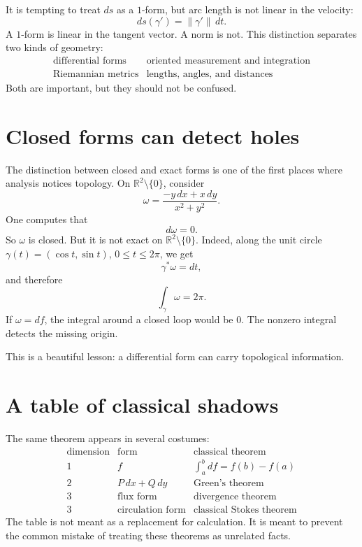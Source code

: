It is tempting to treat \(ds\) as a \(1\)-form, but arc length is not linear in the velocity:
\[
  ds(\gamma')=\|\gamma'\|\,dt.
\]
A \(1\)-form is linear in the tangent vector. A norm is not. This distinction separates two kinds of geometry:
\[
\begin{array}{c|c}
\text{differential forms} & \text{oriented measurement and integration}\\
\text{Riemannian metrics} & \text{lengths, angles, and distances}
\end{array}
\]
Both are important, but they should not be confused.


\section{Closed forms can detect holes}

The distinction between closed and exact forms is one of the first places where analysis notices topology.  On \(\mathbb R^2\setminus\{0\}\), consider
\[
  \omega=\frac{-y\,dx+x\,dy}{x^2+y^2}.
\]
One computes that
\[
  d\omega=0.
\]
So \(\omega\) is closed.  But it is not exact on \(\mathbb R^2\setminus\{0\}\).  Indeed, along the unit circle \(\gamma(t)=(\cos t,\sin t)\), \(0\le t\le2\pi\), we get
\[
  \gamma^*\omega=dt,
\]
and therefore
\[
  \int_\gamma\omega=2\pi.
\]
If \(\omega=df\), the integral around a closed loop would be \(0\).  The nonzero integral detects the missing origin.

This is a beautiful lesson: a differential form can carry topological information.

\section{A table of classical shadows}

The same theorem appears in several costumes:
\[
\begin{array}{c|c|c}
\text{dimension} & \text{form} & \text{classical theorem}\\
\hline
1 & f & \int_a^b df=f(b)-f(a)\\
2 & P\,dx+Q\,dy & \text{Green's theorem}\\
3 & \text{flux form} & \text{divergence theorem}\\
3 & \text{circulation form} & \text{classical Stokes theorem}
\end{array}
\]
The table is not meant as a replacement for calculation.  It is meant to prevent the common mistake of treating these theorems as unrelated facts.

